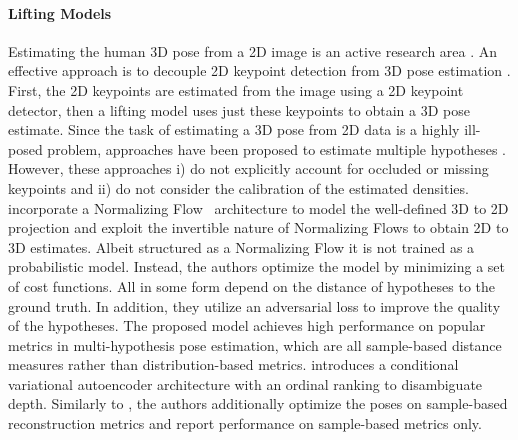 \documentclass{article} \usepackage{iclr2023_conference,times}
\begin{document}
\paragraph{Lifting Models} Estimating the human 3D pose from a 2D image is an active research area \citep{Pavlakos2016-zj, martinez_2017_3dbaseline, zhaoCVPR19semantic, Wu2022-jb}.
An effective approach is to decouple 2D keypoint detection from 3D pose estimation \citep{martinez_2017_3dbaseline}. First, the 2D keypoints are estimated from the image using a 2D keypoint detector, then a lifting model uses just these keypoints to obtain a 3D pose estimate.
Since the task of estimating a 3D pose from 2D data is a highly ill-posed problem, approaches have been proposed to estimate multiple hypotheses \citep{Li_Hee_Lee_2019, Sharma_Varigonda_Bindal_Sharma_Jain_2019,  Oikarinen_Hannah_Kazerounian_2020, kolotouros2021, Li_Liu_Tang_Wang_Van_Gool_2021, Wehrbein_Rudolph_Rosenhahn_Wandt_2021}.
However, these approaches i) do not explicitly account for occluded or missing keypoints and ii) do not consider the calibration of the estimated densities.
\citet{Wehrbein_Rudolph_Rosenhahn_Wandt_2021} incorporate a Normalizing Flow~\citep{Tabak2000-ie} architecture to model the well-defined 3D to 2D projection and exploit the invertible nature of Normalizing Flows to obtain 2D to 3D estimates.
Albeit structured as a Normalizing Flow it is not trained as a probabilistic model.
Instead, the authors optimize the model by minimizing a set of cost functions. All in some form depend on the distance of hypotheses to the ground truth.
In addition, they utilize an adversarial loss to improve the quality of the hypotheses.
The proposed model achieves high performance on popular metrics in multi-hypothesis pose estimation, which are all sample-based distance measures rather than distribution-based metrics.
\citet{Sharma_Varigonda_Bindal_Sharma_Jain_2019} introduces a conditional variational autoencoder architecture with an ordinal ranking to disambiguate depth.
Similarly to \citet{Wehrbein_Rudolph_Rosenhahn_Wandt_2021}, the authors additionally optimize the poses on sample-based reconstruction metrics and report performance on sample-based metrics only.
\end{document}
